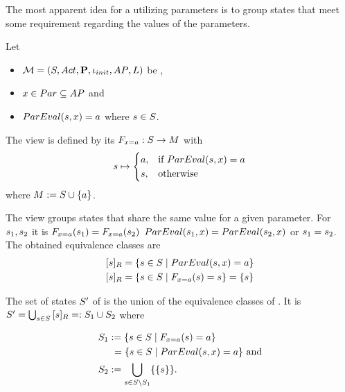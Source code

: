 \documentclass[preview]{standalone}
\begin{document}
The most apparent idea for a \viewN utilizing parameters is to group states that meet some requirement regarding the values of the parameters.



\begin{definition}
	Let
	\begin{itemize}
		\item ${{{\mathcal{M}}}} = {{({S}, {Act}, {\textbf{P}}, {\iota_{init}}, {AP}, {L})}}$ be \chosengraphtypeN,
		\item ${x} \in {Par} \subseteq {AP}$ and 
		\item ${ParEval}({s}, {x}) = {a}$ where ${s} \in {S}$.		
	\end{itemize} 
	The view \viewparamvalueseq is defined by its \grpfctN ${{F_{{x} = {a}}}} : {S} \to {\ensuremath{{M}}}$ with
	\[
	{s} \mapsto
	\begin{cases}
		{a}, &\text{if } {ParEval}({s}, {x}) = {a}\\
		{{s}}, &\text{otherwise}
	\end{cases}
	\]
	where ${{M}} := {{S}} \cup \{a\}$.
\end{definition}

The view \viewparamvalueseq groups states that share the same value for a given parameter. For ${s}_1, {s}_2$ it is ${{F_{{x} = {a}}}}({s}_1) = {{F_{{x} = {a}}}}({s}_2)$ \iffN ${ParEval}({s}_1, {x}) = {ParEval}({s}_2, {x})$ or ${s}_1 = {s}_2$. The obtained equivalence classes are
\begin{align*}
	{\ensuremath{{[{s}]_{{R}}}}} &= \{{s} \in {S} \mid {ParEval}({s}, {x}) = {a}\} \\
	{{[{s}]_{{R}}}} &= \{{s} \in {S} \mid {\ensuremath{{F_{{x} = {a}}}}}({s}) = {s}\} = \{{s}\}
\end{align*}

The set of states ${S}'$ of \viewparamvalueseq is the union of the equivalence classes of \eqrelview. It is ${S}' = \bigcup_{{s} \in {S}} {{[{s}]_{{R}}}} =: {S}_1 \cup {S}_2$ where

\begin{align*}
	{S}_1 &:= \{{s} \in {S} \mid {\ensuremath{{F_{{x} = {a}}}}}({s}) = {a}\} \\
	&\hspace{1.15mm}= \{{s} \in {S}  \mid {ParEval}({s}, {x}) = {a}\} \text{ and} \\
	{S}_2 &:= {\bigcup_{{s} \in {S} \setminus {S}_1}\{\{{s}\}\}}.
\end{align*}
\end{document}
